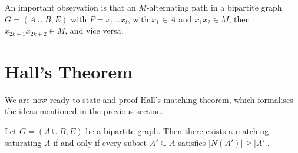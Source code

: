 \documentclass[a4paper]{scrreprt}
\begin{document}
An important observation is that an $M$-alternating path in a bipartite graph $G = (A\cup B, E)$ with $P = x_1 \dots x_l$, with $x_1 \in A$ and $x_1 x_2 \in M$, then $x_{2k + 1}x_{2k + 2} \in M$, and vice versa.

\section{Hall's Theorem}

We are now ready to state and proof Hall's matching theorem, which formalises the ideas mentioned in the previous section.

\begin{theorem}
	Let $G = (A \cup B, E)$ be a bipartite graph. Then there exists a matching saturating $A$ if and only if every subset $A' \subseteq A$ satisfies $|N(A')| \geq |A'|$.
\end{theorem}
\end{document}
